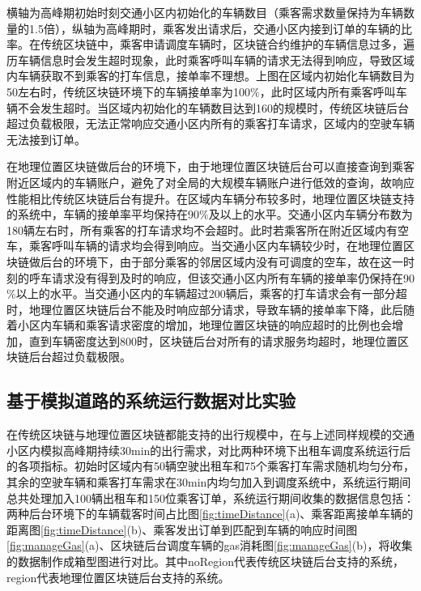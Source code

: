 横轴为高峰期初始时刻交通小区内初始化的车辆数目（乘客需求数量保持为车辆数量的1.5倍），纵轴为高峰期时，乘客发出请求后，交通小区内接到订单的车辆的比率。在传统区块链中，乘客申请调度车辆时，区块链合约维护的车辆信息过多，遍历车辆信息时会发生超时现象，此时乘客呼叫车辆的请求无法得到响应，导致区域内车辆获取不到乘客的打车信息，接单率不理想。上图在区域内初始化车辆数目为50左右时，传统区块链环境下的车辆接单率为100$\%$，此时区域内所有乘客呼叫车辆不会发生超时。当区域内初始化的车辆数目达到160的规模时，传统区块链后台超过负载极限，无法正常响应交通小区内所有的乘客打车请求，区域内的空驶车辆无法接到订单。

​在地理位置区块链做后台的环境下，由于地理位置区块链后台可以直接查询到乘客附近区域内的车辆账户，避免了对全局的大规模车辆账户进行低效的查询，故响应性能相比传统区块链后台有提升。在区域内车辆分布较多时，地理位置区块链支持的系统中，车辆的接单率平均保持在90$\%$及以上的水平。交通小区内车辆分布数为180辆左右时，所有乘客的打车请求均不会超时。此时若乘客所在附近区域内有空车，乘客呼叫车辆的请求均会得到响应。当交通小区内车辆较少时，在地理位置区块链做后台的环境下，由于部分乘客的邻居区域内没有可调度的空车，故在这一时刻的呼车请求没有得到及时的响应，但该交通小区内所有车辆的接单率仍保持在90$\%$以上的水平。当交通小区内的车辆超过200辆后，乘客的打车请求会有一部分超时，地理位置区块链后台不能及时响应部分请求，导致车辆的接单率下降，此后随着小区内车辆和乘客请求密度的增加，地理位置区块链的响应超时的比例也会增加，直到车辆密度达到800时，区块链后台对所有的请求服务均超时，地理位置区块链后台超过负载极限。

\subsection{基于模拟道路的系统运行数据对比实验}
在传统区块链与地理位置区块链都能支持的出行规模中，在与上述同样规模的交通小区内模拟高峰期持续30min的出行需求，对比两种环境下出租车调度系统运行后的各项指标。初始时区域内有50辆空驶出租车和75个乘客打车需求随机均匀分布，其余的空驶车辆和乘客打车需求在30min内均匀加入到调度系统中，系统运行期间总共处理加入100辆出租车和150位乘客订单，系统运行期间收集的数据信息包括：两种后台环境下的车辆载客时间占比图\ref{fig:timeDistance}(a)、乘客距离接单车辆的距离图\ref{fig:timeDistance}(b)、乘客发出订单到匹配到车辆的响应时间图\ref{fig:manageGas}(a)、区块链后台调度车辆的gas消耗图\ref{fig:manageGas}(b)，将收集的数据制作成箱型图进行对比。其中noRegion代表传统区块链后台支持的系统，region代表地理位置区块链后台支持的系统。

